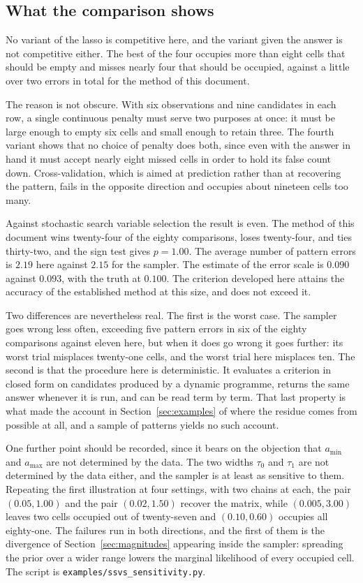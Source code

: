 

\subsection{What the comparison shows}

No variant of the lasso is competitive here, and the variant given the answer is not
competitive either. The best of the four occupies more than eight cells that should
be empty and misses nearly four that should be occupied, against a little over two
errors in total for the method of this document.

The reason is not obscure. With six observations and nine candidates in each row, a
single continuous penalty must serve two purposes at once: it must be large enough to
empty six cells and small enough to retain three. The fourth variant shows that no
choice of penalty does both, since even with the answer in hand it must accept nearly
eight missed cells in order to hold its false count down. Cross-validation, which is
aimed at prediction rather than at recovering the pattern, fails in the opposite
direction and occupies about nineteen cells too many.

Against stochastic search variable selection the result is even. The method of this
document wins twenty-four of the eighty comparisons, loses twenty-four, and ties
thirty-two, and the sign test gives $p = 1.00$. The average number of pattern errors
is $2.19$ here against $2.15$ for the sampler. The estimate of the error scale is
$0.090$ against $0.093$, with the truth at $0.100$. The criterion developed here
attains the accuracy of the established method at this size, and does not exceed it.

Two differences are nevertheless real. The first is the worst case. The sampler goes
wrong less often, exceeding five pattern errors in six of the eighty comparisons
against eleven here, but when it does go wrong it goes further: its worst trial
misplaces twenty-one cells, and the worst trial here misplaces ten. The second is
that the procedure here
is deterministic. It evaluates a criterion in closed form on candidates produced by a
dynamic programme, returns the same answer whenever it is run, and can be read term
by term. That last property is what made the account in Section~\ref{sec:examples} of
where the residue comes from possible at all, and a sample of patterns yields no such
account.

One further point should be recorded, since it bears on the objection that
$a_{\min}$ and $a_{\max}$ are not determined by the data. The two widths
$\tau_{0}$ and $\tau_{1}$ are not determined by the data either, and the sampler is
at least as sensitive to them. Repeating the first illustration at four settings,
with two chains at each, the pair $(0.05, 1.00)$ and the pair $(0.02, 1.50)$ recover
the matrix, while $(0.005, 3.00)$ leaves two cells occupied out of twenty-seven and
$(0.10, 0.60)$ occupies all eighty-one. The failures run in both directions, and the
first of them is the divergence of Section~\ref{sec:magnitudes} appearing inside the
sampler: spreading the prior over a wider range lowers the marginal likelihood of
every occupied cell. The script is \texttt{examples/ssvs\_sensitivity.py}.

